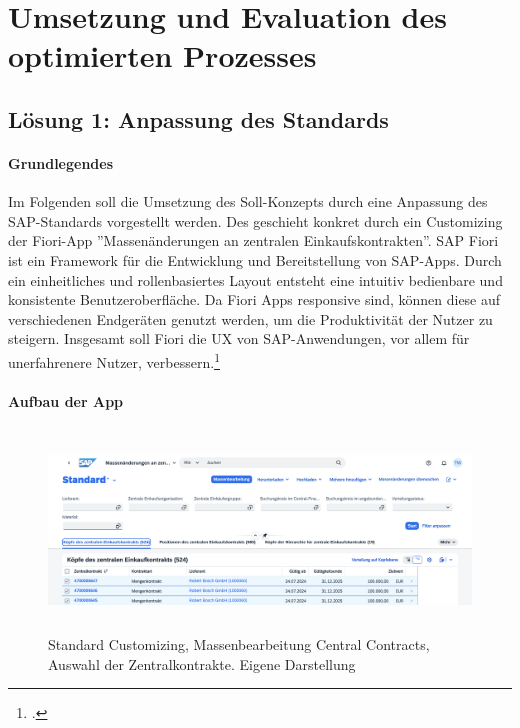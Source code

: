 \chapter{Umsetzung und Evaluation des optimierten Prozesses}

\section{Lösung 1: Anpassung des Standards} \label{sec:Kapitel41}

\subsubsection{Grundlegendes}

Im Folgenden soll die Umsetzung des Soll-Konzepts durch eine Anpassung des SAP-Standards vorgestellt werden. Des geschieht konkret durch ein Customizing der Fiori-App ''Massenänderungen an zentralen Einkaufskontrakten''. SAP Fiori ist ein Framework für die Entwicklung und Bereitstellung von SAP-Apps. Durch ein einheitliches und rollenbasiertes Layout entsteht eine intuitiv bedienbare und konsistente Benutzeroberfläche. Da Fiori Apps responsive sind, können diese auf verschiedenen Endgeräten genutzt werden, um die Produktivität der Nutzer zu steigern. Insgesamt soll Fiori die UX von SAP-Anwendungen, vor allem für unerfahrenere Nutzer, verbessern.\footcite[Vgl.][]{praxis_sap_fiori_allgemein_2024}

\subsubsection{Aufbau der App}

\begin{figure}[H]
    \centering
    \includegraphics[height=5.31cm]{Bilder/Praxisteil-S-Schritt-1.png}
    \caption[Standard Customizing, Massenbearbeitung Central Contracts, Auswahl der Zentralkontrakte]{Standard Customizing, Massenbearbeitung Central Contracts, Auswahl der Zentralkontrakte. Eigene Darstellung}
    \label{fig:PraxisSSchritt1}
\end{figure}

